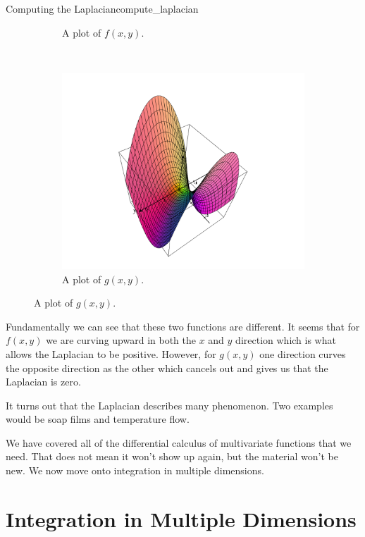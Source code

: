 \begin{ex}{Computing the Laplacian}{compute_laplacian}
\begin{figure}[H]
\begin{subfigure}[h]{.45\textwidth}
            \caption{A plot of $f(x,y).$}
            \end{subfigure}
            ~
            \begin{subfigure}[h]{.45\textwidth}
            \includegraphics[width=\textwidth]{Figures/0_laplace.png}
            \caption{A plot of $g(x,y).$}
            \end{subfigure}
        \end{figure}
        Fundamentally we can see that these two functions are different.  It seems that for $f(x,y)$ we are curving upward in both the $x$ and $y$ direction which is what allows the Laplacian to be positive. However, for $g(x,y)$ one direction curves the opposite direction as the other which cancels out and gives us that the Laplacian is zero.  
        
        It turns out that the Laplacian describes many phenomenon. Two examples would be soap films and temperature flow.
        \end{ex}

        
        We have covered all of the differential calculus of multivariate functions that we need.  That does not mean it won't show up again, but the material won't be new.  We now move onto integration in multiple dimensions.
        
        \chapter{Integration in Multiple Dimensions}
        
